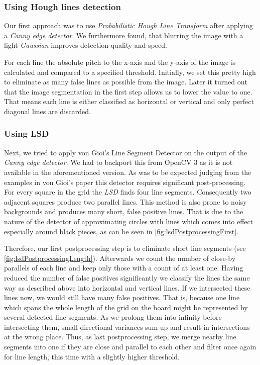 	\subsubsection{Using Hough lines detection}
	\label{detector-visible-hough}
	Our first approach was to use \emph{Probabilistic Hough Line Transform} after applying a \emph{Canny edge detector}. We furthermore found, that blurring the image with a light \emph{Gaussian} improves detection quality and speed.

	For each line the absolute pitch to the x-axis and the y-axis of the image is calculated and compared to a specified threshold. Initially, we set this pretty high to eliminate as many false lines as possible from the image. Later it turned out that the image segmentation in the first step allows us to lower the value to one. That means each line is either classified as horizontal or vertical and only perfect diagonal lines are discarded.

	\subsubsection{Using LSD}
	\label{detector-visible-lsd}
	Next, we tried to apply von Gioi's Line Segment Detector \cite{von2012lsd} on the output of the \emph{Canny edge detector}. We had to backport this from OpenCV 3 as it is not available in the aforementioned version. As was to be expected judging from the examples in von Gioi's paper this detector requires significant post-processing. For every square in the grid the \emph{LSD} finds four line segments. Consequently two adjacent squares produce two parallel lines. This method is also prone to noisy backgrounds and produces many short, false positive lines. That is due to the nature of the detector of approximating circles with lines which comes into effect especially around black pieces, as can be seen in \autoref{fig:lsdPostprocessingFirst}.

	Therefore, our first postprocessing step is to eliminate short line segments (see \autoref{fig:lsdPostprocessingLength}). Afterwards we count the number of close-by parallels of each line and keep only those with a count of at least one. Having reduced the number of false positives significantly we classify the lines the same way as described above into horizontal and vertical lines. If we intersected these lines now, we would still have many false positives. That is, because one line which spans the whole length of the grid on the board might be represented by several detected line segments. As we prolong them into infinity before intersecting them, small directional variances sum up and result in intersections at the wrong place. Thus, as last postprocessing step, we merge nearby line segments into one if they are close and parallel to each other and filter once again for line length, this time with a slightly higher threshold.

